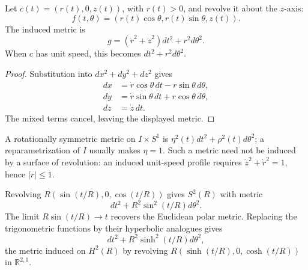\begin{example}
  \label{ex:pet-ch1-surface-of-revolution}


  Let $c(t)=(r(t),0,z(t))$, with $r(t)>0$, and revolve it about the $z$-axis:
  \[
    f(t,\theta)=(r(t)\cos\theta,r(t)\sin\theta,z(t)).
  \]
  The induced metric is
  \[
    g=(\dot r^2+\dot z^2)dt^2+r^2d\theta^2.
  \]
  When $c$ has unit speed, this becomes $dt^2+r^2d\theta^2$.
\end{example}
\begin{proof}

  \sketch
  Substitution into $dx^2+dy^2+dz^2$ gives
  \[
  \begin{aligned}
    dx&=\dot r\cos\theta\,dt-r\sin\theta\,d\theta,\\
    dy&=\dot r\sin\theta\,dt+r\cos\theta\,d\theta,\\
    dz&=\dot z\,dt.
  \end{aligned}
  \]
  The mixed terms cancel, leaving the displayed metric.
\end{proof}

\begin{remark}
  \label{rem:pet-ch1-rotationally-symmetric}


  A rotationally symmetric metric on $I\times S^1$ is
  $\eta^2(t)dt^2+\rho^2(t)d\theta^2$; a reparametrization of $I$ usually makes
  $\eta=1$. Such a metric need not be induced by a surface of revolution:
  an induced unit-speed profile requires $\dot z^2+\dot r^2=1$, hence
  $|\dot r|\le1$.
\end{remark}

\begin{example}
  \label{ex:pet-ch1-sphere-revolution}


  Revolving $R(\sin(t/R),0,\cos(t/R))$ gives $S^2(R)$ with metric
  \[
    dt^2+R^2\sin^2(t/R)d\theta^2.
  \]
  The limit $R\sin(t/R)\to t$ recovers the Euclidean polar metric. Replacing
  the trigonometric functions by their hyperbolic analogues gives
  \[
    dt^2+R^2\sinh^2(t/R)d\theta^2,
  \]
  the metric induced on $H^2(R)$ by revolving
  $R(\sinh(t/R),0,\cosh(t/R))$ in $\mathbb{R}^{2,1}$.
\end{example}

